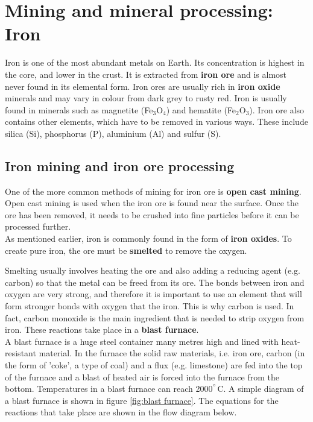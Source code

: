 



\section{Mining and mineral processing: Iron}
\label{sec:mining:iron}

Iron is one of the most abundant metals on Earth. Its concentration is highest in the core, and lower in the crust. It is extracted from \textbf{iron ore} and is almost never found in its elemental form. Iron ores are usually rich in \textbf{iron oxide} minerals and may vary in colour from dark grey to rusty red. Iron is usually found in minerals such as magnetite (Fe$_{3}$O$_{4}$) and hematite (Fe$_{2}$O$_{3}$). Iron ore also contains other elements, which have to be removed in various ways. These include silica (Si), phosphorus (P), aluminium (Al) and sulfur (S).

\subsection{Iron mining and iron ore processing}

One of the more common methods of mining for iron ore is \textbf{open cast mining}. Open cast mining is used when the iron ore is found near the surface. Once the ore has been removed, it needs to be crushed into fine particles before it can be processed further.\\

As mentioned earlier, iron is commonly found in the form of \textbf{iron oxides}. To create pure iron, the ore must be \textbf{smelted} to remove the oxygen.


Smelting usually involves heating the ore and also adding a reducing agent (e.g. carbon) so that the metal can be freed from its ore. The bonds between iron and oxygen are very strong, and therefore it is important to use an element that will form stronger bonds with oxygen that the iron. This is why carbon is used. In fact, carbon monoxide is the main ingredient that is needed to strip oxygen from iron. These reactions take place in a \textbf{blast furnace}.\\

A blast furnace is a huge steel container many metres high and lined with heat-resistant material. In the furnace the solid raw materials, i.e. iron ore, carbon (in the form of 'coke', a type of coal) and a flux (e.g. limestone) are fed into the top of the furnace and a blast of heated air is forced into the furnace from the bottom. Temperatures in a blast furnace can reach 2000$^{^{\circ}}$C. A simple diagram of a blast furnace is shown in figure \ref{fig:blast furnace}. The equations for the reactions that take place are shown in the flow diagram below. \\

